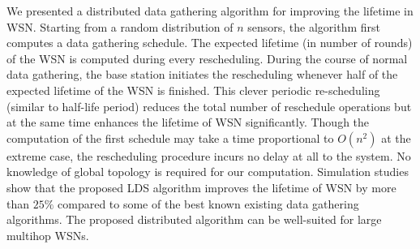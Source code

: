 \documentclass[10pt]{llncs}
\begin{document}
We presented a distributed data gathering algorithm for improving the lifetime in WSN. Starting from a random distribution of $n$ sensors, the algorithm first computes a data gathering schedule. The expected lifetime (in number of rounds) of the WSN is computed during every rescheduling. During the course of normal data gathering, the base station initiates the rescheduling whenever half of the expected lifetime of the WSN is finished. This clever periodic re-scheduling (similar to half-life period) reduces the total number of reschedule operations but at the same time enhances the lifetime of WSN significantly. Though the computation of the first schedule may take a time proportional to $O(n^2)$ at the extreme case, the rescheduling procedure incurs no delay at all to the system. No knowledge of global topology is required for our computation. Simulation studies show that the proposed LDS algorithm improves the lifetime of WSN by more than $25\%$ compared to some of the best known existing data gathering algorithms. The proposed distributed algorithm can be  well-suited for large multihop WSNs.



\end{document}
